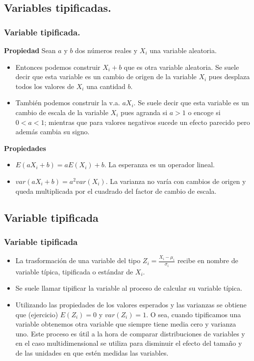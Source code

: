 \subsection{Variables tipificadas.}
\begin{frame}
\frametitle{Variable tipificada.}

\textbf{Propiedad}
Sean $a$ y $b$ dos números reales y $X_i$ una variable aleatoria. 
 

\begin{itemize}
\item Entonces podemos construir $X_i+b$ que es otra variable aleatoria. Se suele decir que esta variable es un cambio de origen de la variable $X_i$ pues desplaza todos los valores de $X_i$ una cantidad $b$.
\item También podemos construir la v.a. $a X_i$. Se suele decir que esta variable es un cambio de escala de la variable $X_i$ pues agranda si $a>1$ o encoge si $0<a<1$; mientras que para valores negativos sucede un efecto parecido pero además cambia su signo.
\end{itemize}
\end{frame}

\begin{frame}
\textbf{Propiedades}

\begin{itemize}
\item $E(a X_i +b)=a E(X_i)+b$. La esperanza es un operador lineal.
\item $var(a X_i +b)=a^2 var(X_i)$. La varianza no varía con cambios de origen y queda multiplicada por el cuadrado del  factor de cambio de escala.
\end{itemize}

\end{frame}
\subsection{Variable tipificada}
\begin{frame}
\frametitle{Variable tipificada}

\begin{itemize}
\item La trasformación de una variable del tipo $Z_i=\frac{X_i-\mu_i}{\sigma_i}$ recibe en nombre de variable típica, tipificada o estándar de  $X_i$.
\item Se suele llamar tipificar la variable  al proceso de calcular su variable típica.
\item Utilizando las propiedades de los valores esperados y las varianzas se obtiene que (ejercicio) $E(Z_i)=0$ y $var(Z_i)=1$. O sea, cuando tipificamos una variable obtenemos otra variable que siempre tiene media cero y varianza uno. 
Este proceso es útil  a la hora de comparar distribuciones de variables y en el caso multidimensional se utiliza para disminuir el efecto del tamaño y de las unidades en que estén medidas las variables.
\end{itemize}


\end{frame}
